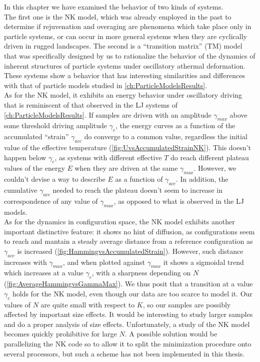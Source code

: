 In this chapter we have examined the behavior of two kinds of systems. \\
The first one is the NK model, which was already employed in the past \cite{isner2006generic} to determine if rejuvenation and overaging are phenomena which take place only in particle systems, or can occur in more general systems when they are cyclically driven in rugged landscapes.
The second is a ``transition matrix'' (TM) model that was specifically designed by us to rationalize the behavior of the dynamics of inherent structures of particle systems under oscillatory athermal deformation. \\
These systems show a behavior that has interesting similarities and differences with that of particle models studied in \autoref{ch:ParticleModelsResults}. \\
As for the NK model, it exhibits an energy behavior under oscillatory driving that is reminiscent of that observed in the LJ systems of \autoref{ch:ParticleModelsResults}. If samples are driven with an amplitude $\gamma_{max}$ above some threshold driving amplitude $\gamma_{c}$, the energy curves as a function of the accumulated ``strain'' $\gamma_{acc}$ do converge to a common value, regardless the initial value of the effective temperature (\autoref{fig:UvsAccumulatedStrainNK}). This doesn't happen below $\gamma_{c}$, as systems with different effective $T$ do reach different plateau values of the energy $E$ when they are driven at the same $\gamma_{max}$. However, we couldn't devise a way to describe $E$ as a function of $\gamma_{acc}$. In addition, the cumulative $\gamma_{acc}$ needed to reach the plateau doesn't seem to increase in correspondence of any value of $\gamma_{max}$, as opposed to what is observed in the LJ models. \\
As for the dynamics in configuration space, the NK model exhibits another important distinctive feature: it shows no hint of diffusion, as configurations seem to reach and mantain a steady average distance from a reference configuration as $\gamma_{acc}$ is increased (\autoref{fig:HammingvsAccumulatedStrain}). However, such distance increases with $\gamma_{max}$, and when plotted against $\gamma_{max}$ it shows a sigmoidal trend which increases at a value $\gamma_{c}$, with a sharpness depending on $N$ (\autoref{fig:AverageHammingvsGammaMax}). We thus posit that a transition at a value $\gamma_{c}$ holds for the NK model, even though our data are too scarce to model it. Our values of $N$ are quite small with respect to $K$, so our samples are possibly affected by important size effects. It would be interesting to study larger samples and do a proper analysis of size effects. Unfortunately, a study of the NK model becomes quickly prohibitive for large $N$. A possible solution would be parallelizing the NK code so to allow it to split the minimization procedure onto several processors, but such a scheme has not been implemented in this thesis.\\
